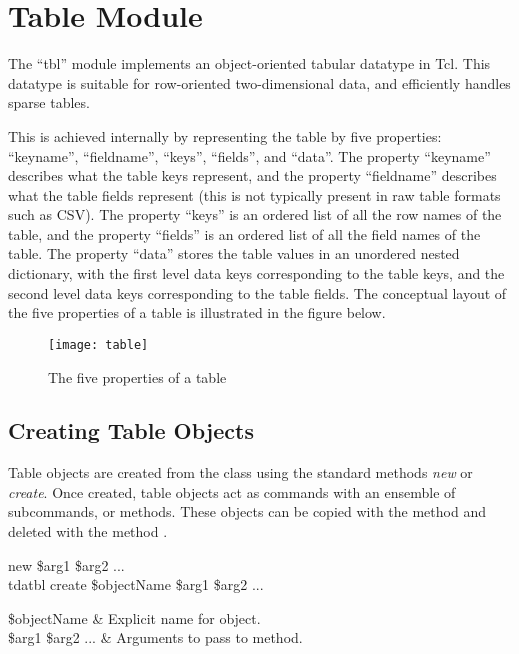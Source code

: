 \cleartooddpage[\thispagestyle{empty}]
\chapter{Table Module}
The ``tbl'' module implements an object-oriented tabular datatype in Tcl. 
This datatype is suitable for row-oriented two-dimensional data, and efficiently handles sparse tables. 

This is achieved internally by representing the table by five properties: ``keyname'', ``fieldname'', ``keys'', ``fields'', and ``data''. The property ``keyname'' describes what the table keys represent, and the property ``fieldname'' describes what the table fields represent (this is not typically present in raw table formats such as CSV). The property ``keys'' is an ordered list of all the row names of the table, and the property ``fields'' is an ordered list of all the field names of the table. The property ``data'' stores the table values in an unordered nested dictionary, with the first level data keys corresponding to the table keys, and the second level data keys corresponding to the table fields. The conceptual layout of the five properties of a table is illustrated in the figure below.
\vspace{\baselineskip}
\FloatBarrier
\begin{figure}[!htb]
    \centering
    \texttt{[image: table]}
    \caption{The five properties of a table}
    \label{fig:table_props}
\end{figure}
\clearpage
\section{Creating Table Objects}
Table objects are created from the  class using the standard methods \textit{new} or \textit{create}. 
Once created, table objects act as commands with an ensemble of subcommands, or methods. 
These objects can be copied with the method  and deleted with the method .
\begin{syntax}
 new \$arg1 \$arg2 ...\\
tdatbl create \$objectName \$arg1 \$arg2 ...
\end{syntax}
\begin{args}
\$objectName & Explicit name for object. \\
\$arg1 \$arg2 ... & Arguments to pass to  method.
\end{args}

